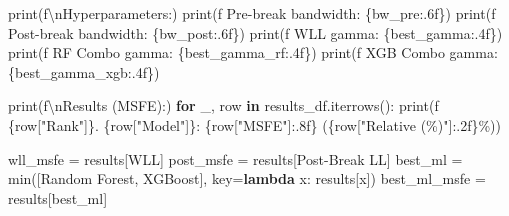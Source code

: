\documentclass[
  letterpaper,
  DIV=11,
  numbers=noendperiod]{scrartcl}
\newenvironment{Shaded}{\begin{snugshade}}{\end{snugshade}}
\newcommand{\BuiltInTok}[1]{\textcolor[rgb]{0.00,0.23,0.31}{#1}}
\newcommand{\CharTok}[1]{\textcolor[rgb]{0.13,0.47,0.30}{#1}}
\newcommand{\ControlFlowTok}[1]{\textcolor[rgb]{0.00,0.23,0.31}{\textbf{#1}}}
\newcommand{\KeywordTok}[1]{\textcolor[rgb]{0.00,0.23,0.31}{\textbf{#1}}}
\newcommand{\NormalTok}[1]{\textcolor[rgb]{0.00,0.23,0.31}{#1}}
\newcommand{\OperatorTok}[1]{\textcolor[rgb]{0.37,0.37,0.37}{#1}}
\newcommand{\SpecialCharTok}[1]{\textcolor[rgb]{0.37,0.37,0.37}{#1}}
\newcommand{\SpecialStringTok}[1]{\textcolor[rgb]{0.13,0.47,0.30}{#1}}
\newcommand{\StringTok}[1]{\textcolor[rgb]{0.13,0.47,0.30}{#1}}
\begin{document}
\begin{Shaded}
\begin{Highlighting}[]
\BuiltInTok{print}\NormalTok{(}\SpecialStringTok{f\textquotesingle{}}\CharTok{\textbackslash{}n}\SpecialStringTok{Hyperparameters:\textquotesingle{}}\NormalTok{)}
\BuiltInTok{print}\NormalTok{(}\SpecialStringTok{f\textquotesingle{}  Pre{-}break bandwidth: }\SpecialCharTok{\{}\NormalTok{bw\_pre}\SpecialCharTok{:.6f\}}\SpecialStringTok{\textquotesingle{}}\NormalTok{)}
\BuiltInTok{print}\NormalTok{(}\SpecialStringTok{f\textquotesingle{}  Post{-}break bandwidth: }\SpecialCharTok{\{}\NormalTok{bw\_post}\SpecialCharTok{:.6f\}}\SpecialStringTok{\textquotesingle{}}\NormalTok{)}
\BuiltInTok{print}\NormalTok{(}\SpecialStringTok{f\textquotesingle{}  WLL gamma: }\SpecialCharTok{\{}\NormalTok{best\_gamma}\SpecialCharTok{:.4f\}}\SpecialStringTok{\textquotesingle{}}\NormalTok{)}
\BuiltInTok{print}\NormalTok{(}\SpecialStringTok{f\textquotesingle{}  RF Combo gamma: }\SpecialCharTok{\{}\NormalTok{best\_gamma\_rf}\SpecialCharTok{:.4f\}}\SpecialStringTok{\textquotesingle{}}\NormalTok{)}
\BuiltInTok{print}\NormalTok{(}\SpecialStringTok{f\textquotesingle{}  XGB Combo gamma: }\SpecialCharTok{\{}\NormalTok{best\_gamma\_xgb}\SpecialCharTok{:.4f\}}\SpecialStringTok{\textquotesingle{}}\NormalTok{)}

\BuiltInTok{print}\NormalTok{(}\SpecialStringTok{f\textquotesingle{}}\CharTok{\textbackslash{}n}\SpecialStringTok{Results (MSFE):\textquotesingle{}}\NormalTok{)}
\ControlFlowTok{for}\NormalTok{ \_, row }\KeywordTok{in}\NormalTok{ results\_df.iterrows():}
    \BuiltInTok{print}\NormalTok{(}\SpecialStringTok{f\textquotesingle{}  }\SpecialCharTok{\{}\NormalTok{row[}\StringTok{"Rank"}\NormalTok{]}\SpecialCharTok{\}}\SpecialStringTok{. }\SpecialCharTok{\{}\NormalTok{row[}\StringTok{"Model"}\NormalTok{]}\SpecialCharTok{\}}\SpecialStringTok{: }\SpecialCharTok{\{}\NormalTok{row[}\StringTok{"MSFE"}\NormalTok{]}\SpecialCharTok{:.8f\}}\SpecialStringTok{ (}\SpecialCharTok{\{}\NormalTok{row[}\StringTok{"Relative (\%)"}\NormalTok{]}\SpecialCharTok{:.2f\}}\SpecialStringTok{\%)\textquotesingle{}}\NormalTok{)}

\NormalTok{wll\_msfe }\OperatorTok{=}\NormalTok{ results[}\StringTok{\textquotesingle{}WLL\textquotesingle{}}\NormalTok{]}
\NormalTok{post\_msfe }\OperatorTok{=}\NormalTok{ results[}\StringTok{\textquotesingle{}Post{-}Break LL\textquotesingle{}}\NormalTok{]}
\NormalTok{best\_ml }\OperatorTok{=} \BuiltInTok{min}\NormalTok{([}\StringTok{\textquotesingle{}Random Forest\textquotesingle{}}\NormalTok{, }\StringTok{\textquotesingle{}XGBoost\textquotesingle{}}\NormalTok{], key}\OperatorTok{=}\KeywordTok{lambda}\NormalTok{ x: results[x])}
\NormalTok{best\_ml\_msfe }\OperatorTok{=}\NormalTok{ results[best\_ml]}


\end{Highlighting}
\end{Shaded}
\end{document}
